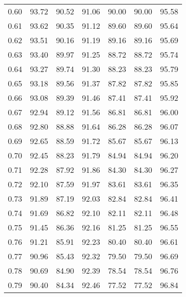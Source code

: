 \begin{tabular}{|c|c|c|c|c|c|c|}
      0.60 &     93.72 &     90.52 &      91.06 &   90.00 &      90.00 &         95.58 \\
      0.61 &     93.62 &     90.35 &      91.12 &   89.60 &      89.60 &         95.64 \\
      0.62 &     93.51 &     90.16 &      91.19 &   89.16 &      89.16 &         95.69 \\
      0.63 &     93.40 &     89.97 &      91.25 &   88.72 &      88.72 &         95.74 \\
      0.64 &     93.27 &     89.74 &      91.30 &   88.23 &      88.23 &         95.79 \\
      0.65 &     93.18 &     89.56 &      91.37 &   87.82 &      87.82 &         95.85 \\
      0.66 &     93.08 &     89.39 &      91.46 &   87.41 &      87.41 &         95.92 \\
      0.67 &     92.94 &     89.12 &      91.56 &   86.81 &      86.81 &         96.00 \\
      0.68 &     92.80 &     88.88 &      91.64 &   86.28 &      86.28 &         96.07 \\
      0.69 &     92.65 &     88.59 &      91.72 &   85.67 &      85.67 &         96.13 \\
      0.70 &     92.45 &     88.23 &      91.79 &   84.94 &      84.94 &         96.20 \\
      0.71 &     92.28 &     87.92 &      91.86 &   84.30 &      84.30 &         96.27 \\
      0.72 &     92.10 &     87.59 &      91.97 &   83.61 &      83.61 &         96.35 \\
      0.73 &     91.89 &     87.19 &      92.03 &   82.84 &      82.84 &         96.41 \\
      0.74 &     91.69 &     86.82 &      92.10 &   82.11 &      82.11 &         96.48 \\
      0.75 &     91.45 &     86.36 &      92.16 &   81.25 &      81.25 &         96.55 \\
      0.76 &     91.21 &     85.91 &      92.23 &   80.40 &      80.40 &         96.61 \\
      0.77 &     90.96 &     85.43 &      92.32 &   79.50 &      79.50 &         96.69 \\
      0.78 &     90.69 &     84.90 &      92.39 &   78.54 &      78.54 &         96.76 \\
      0.79 &     90.40 &     84.34 &      92.46 &   77.52 &      77.52 &         96.84 \\

\end{tabular}
